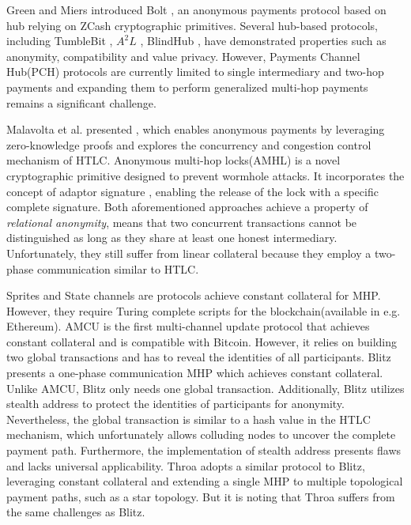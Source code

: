 \documentclass[conference]{IEEEtran}
\begin{document}
Green and Miers introduced Bolt \cite{bolt}, an anonymous payments protocol based on hub relying on ZCash \cite{zerocash} cryptographic 
primitives. Several hub-based protocols, including TumbleBit \cite{tumblebit}, $A^{2}L$ \cite{a2l}, BlindHub \cite{blindhub}, have demonstrated 
properties such as anonymity, compatibility and value privacy. However, Payments Channel Hub(PCH) protocols are currently 
limited to single intermediary and two-hop payments and expanding them to perform generalized multi-hop payments remains a 
significant challenge.

Malavolta et al. presented \cite{mhtlc}, which enables anonymous payments by leveraging zero-knowledge proofs and explores 
the concurrency and congestion control mechanism of HTLC. Anonymous multi-hop locks(AMHL) \cite{amhl} is a novel cryptographic 
primitive designed to prevent wormhole attacks. It incorporates the concept of adaptor signature \cite{gc}, enabling 
the release of the lock with a specific complete signature. Both aforementioned approaches achieve a property of \textit{relational anonymity}, 
means that  two concurrent transactions cannot be distinguished as long as they share at least one honest intermediary. Unfortunately, they 
still suffer from linear collateral because they employ a two-phase communication similar to HTLC. 

Sprites \cite{sprites} and State channels \cite{sc} are protocols achieve constant collateral for MHP. However, they require 
Turing complete scripts for the blockchain(available in e.g. Ethereum). AMCU \cite{amcu} is the first multi-channel update protocol that achieves 
constant collateral and is compatible with Bitcoin. However, it relies on building two global transactions and has to reveal the identities 
of all participants. Blitz \cite{blitz} presents a one-phase communication MHP which achieves constant collateral. Unlike AMCU, Blitz only 
needs one global transaction. Additionally, Blitz utilizes stealth address \cite{stadd} to protect the identities of participants for anonymity. Nevertheless, 
the global transaction is similar to a hash value in the HTLC mechanism, which unfortunately allows colluding nodes to uncover the 
complete payment path. Furthermore, \cite{astrape} the implementation of stealth address presents flaws and lacks universal applicability. 
Throa \cite{th} adopts a similar protocol to Blitz, leveraging constant collateral and extending a single MHP to multiple 
topological payment paths, such as a star topology. But it is noting that Throa suffers from the same challenges as Blitz.
\end{document}
